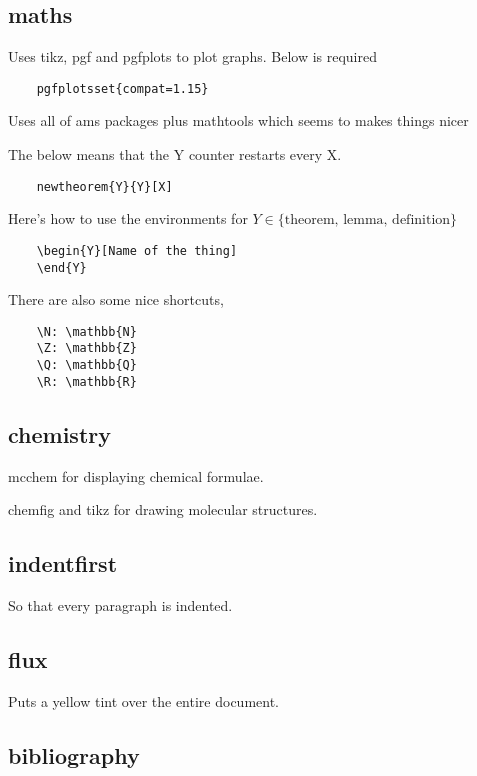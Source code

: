\documentclass{article}
\begin{document}
\subsection{maths}

Uses tikz, pgf and pgfplots to plot graphs. Below is required
\begin{verbatim}
	pgfplotsset{compat=1.15} 
\end{verbatim}

Uses all of ams packages plus mathtools which seems to makes things nicer

The below means that the Y counter restarts every X.

\begin{verbatim}
	newtheorem{Y}{Y}[X]
\end{verbatim}

Here's how to use the environments for $Y \in \{ \text{theorem, lemma, definition} \}$

\begin{verbatim}
	\begin{Y}[Name of the thing]
	\end{Y}
\end{verbatim}

There are also some nice shortcuts,

\begin{verbatim}
	\N: \mathbb{N}
	\Z: \mathbb{Z}
	\Q: \mathbb{Q}
	\R: \mathbb{R}
\end{verbatim}

\subsection{chemistry}

mcchem for displaying chemical formulae.

chemfig and tikz for drawing molecular structures.

\subsection{indentfirst}

So that every paragraph is indented.

\subsection{flux}

Puts a yellow tint over the entire document.

\subsection{bibliography}
\end{document}
